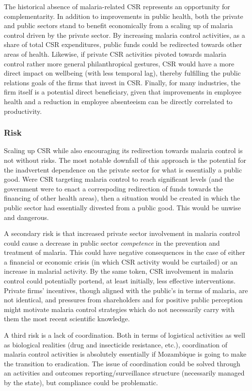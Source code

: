 \documentclass[]{article}
\begin{document}
The historical absence of malaria-related CSR represents an opportunity
for complementarity. In addition to improvements in public health, both
the private and public sectors stand to benefit economically from a
scaling up of malaria control driven by the private sector. By
increasing malaria control activities, as a share of total CSR
expenditures, public funds could be redirected towards other areas of
health. Likewise, if private CSR activities pivoted towards malaria
control rather more general philanthropical gestures, CSR would have a
more direct impact on wellbeing (with less temporal lag), thereby
fulfilling the public relations goals of the firms that invest in CSR.
Finally, for many industries, the firm itself is a potential direct
beneficiary, given that improvements in employee health and a reduction
in employee absenteeism can be directly correlated to productivity.

\subsubsection{Risk}\label{risk}

Scaling up CSR while also encouraging its redirection towards malaria
control is not without risks. The most notable downfall of this approach
is the potential for the inadvertent dependence on the private sector
for what is essentially a public good. Were CSR targeting malaria
control to reach significant levels (and the government were to enact a
correspoding redirection of funds towards the financing of other health
areas), then a situation would be created in which the public sector had
essentially divested from a public good. This would be unwise and
dangerous.

A secondary risk is that increased private sector involvement in malaria
control could cause a decrease in public sector \emph{competence} in the
prevention and treatment of malaria. This could have negative
consequences in the case of either a financial or economic crisis (in
which CSR activity would be curtailed) or an increase in malarial
activity. By the same token, CSR involvement in malaria control could
potentially portend, at least initially, less effective interventions.
Private firms' incentives, though aligned with the public's in terms of
malaria, are not identical, and pressures from shareholders and for
positive public perception might motivate malaria control strategies
which do not necessarily carry with them the most recent scientific
knowledge.

A third risk is a lack of coordination. Both in terms of logistical
activities as well as biological realities (drug and insecticide
resistance, etc.), coordination of malaria control activities is
absolutely essentially if Mozambique is going to make the transition to
eradication. The issue of coordination could be solved through an
activities and outcomes reporting/surveillance structure (necessarily
managed by the state), but compliance could be problematic.
\end{document}
